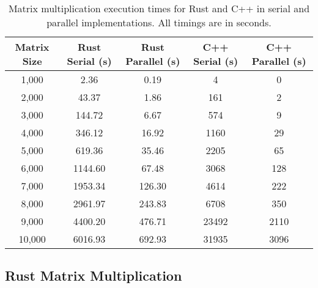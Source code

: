\documentclass[12pt]{article}
\begin{document}
\begin{table}[H]
    \centering
    \begin{tabular}{|c|c|c|c|c|}
        \hline
        \textbf{Matrix Size} & \textbf{Rust Serial (s)} & \textbf{Rust Parallel (s)} & \textbf{C++ Serial (s)} & \textbf{C++ Parallel (s)} \\
        \hline
        1,000                & 2.36                     & 0.19                       & 4                       & 0                         \\
        2,000                & 43.37                    & 1.86                       & 161                     & 2                         \\
        3,000                & 144.72                   & 6.67                       & 574                     & 9                         \\
        4,000                & 346.12                   & 16.92                      & 1160                    & 29                        \\
        5,000                & 619.36                   & 35.46                      & 2205                    & 65                        \\
        6,000                & 1144.60                  & 67.48                      & 3068                    & 128                       \\
        7,000                & 1953.34                  & 126.30                     & 4614                    & 222                       \\
        8,000                & 2961.97                  & 243.83                     & 6708                    & 350                       \\
        9,000                & 4400.20                  & 476.71                     & 23492                   & 2110                      \\
        10,000               & 6016.93                  & 692.93                     & 31935                   & 3096                      \\
        \hline
    \end{tabular}
    \caption{Matrix multiplication execution times for Rust and C++ in serial and parallel implementations.
        All timings are in seconds.}
    \label{tab:matrix-timings}
\end{table}


\subsection{Rust Matrix Multiplication}
\end{document}
